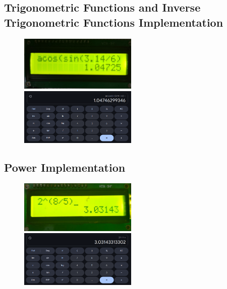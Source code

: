 \documentclass[a4paper,12pt]{article}
\begin{document}
\subsection{Trigonometric Functions and Inverse Trigonometric Functions Implementation}
\begin{figure}[!htb]
    {\includegraphics[width=0.5\textwidth]{./figs/trig.png}}
    \hspace{\fill}
    {\includegraphics[width=0.5\textwidth]{./figs/trig_calc.png}}
\end{figure}

\subsection{Power Implementation}
\begin{figure}[!htb]
    {\includegraphics[width=0.5\textwidth]{./figs/pow.png}}
    \hspace{\fill}
    {\includegraphics[width=0.5\textwidth]{./figs/pow_calc.png}}
\end{figure}
\end{document}
